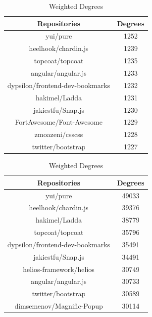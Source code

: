 \documentclass[11pt]{article}
\begin{document}
\begin{table}[ht]
  \scriptsize
  \centering
  \begin{minipage}[b]{0.45\linewidth}
    \centering
    \begin{tabular}{cc}
      Repositories        & Degrees \\
      \hline
      yui/pure            & 1252 \\
      heelhook/chardin.js & 1239 \\
      topcoat/topcoat     & 1235 \\
      angular/angular.js  & 1233 \\
      dypsilon/frontend-dev-bookmarks & 1232 \\
      hakimel/Ladda       & 1231 \\
      jakiestfu/Snap.js   & 1230 \\
      FortAwesome/Font-Awesome & 1229 \\
      zmoazeni/csscss     & 1228 \\
      twitter/bootstrap   & 1227 \\
      \hline
    \end{tabular}
    \caption{Unweighted Degrees}
    \label{tab:unweight_degree}
  \end{minipage} %
  \hfill %
  \begin{minipage}[b]{0.45\linewidth}
    \centering
    \begin{tabular}{cc}
      Repositories        & Degrees \\
      \hline
      yui/pure            & 49033 \\
      heelhook/chardin.js & 39376 \\
      hakimel/Ladda       & 38779 \\
      topcoat/topcoat     & 35796 \\
      dypsilon/frontend-dev-bookmarks & 35491 \\
      jakiestfu/Snap.js   & 34491 \\
      helios-framework/helios & 30749 \\
      angular/angular.js  & 30733 \\
      twitter/bootstrap   & 30589 \\
      dimsemenov/Magnific-Popup & 30114 \\
      \hline
    \end{tabular}
    \caption{Weighted Degrees}
    \label{tab:weight_degree}
  \end{minipage}


\end{table}
\end{document}
